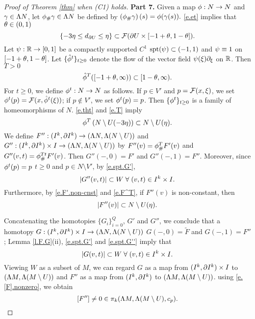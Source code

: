 \documentclass[11pt,twoside]{article}
\begin{document}
\begin{proof}[Proof of Theorem \ref{thm} when (C1) holds]
\noindent\textbf{Part 7.} Given a \cts map \(\phi:N \rightarrow N \) and \(\gamma \in \Lambda N\), let \(\phi_{\#}\gamma\in \Lambda N\) be defined by \(\left(\phi_{\#}\gamma\right)(s)=\phi(\gamma(s)). \) \eqref{e.et} implies that \tes \(\theta \in (0,1)\) \st 
\begin{equation}\label{e.tht}
\{-3\eta \leq d_{\partial U}\leq \eta\} \subset \mathcal{F}(\partial U\times [-1+\theta,1-\theta]).
\end{equation}
Let \(\psi:\mathbb{R}\rightarrow [0,1]\) be a compactly supported \(C^1\) \fn \sot \(\text{spt}(\psi)\subset (-1,1)\) and \(\psi\equiv 1\) on \([-1+\theta,1-\theta]\). Let \(\{\hat{\phi}^t\}_{t\geq 0}\) denote the flow of the vector field $\psi(\xi)\partial_{\xi}$ on $\mathbb{R}$. Then \tes \(T>0\) \st 
\begin{equation}\label{e.T}
\hat{\phi}^T([-1+\theta,\infty)) \subset [1-\theta,\infty).
\end{equation}
For \(t\geq 0\), we define \(\phi^t:N\rightarrow N\) as follows. If \(p\in V'\) and \(p=\mathcal{F}(x,\xi)\), we set \(\phi^t(p)=\mathcal{F}(x,\hat{\phi}^t(\xi))\); if \(p\notin V'\), we set \(\phi^t(p)=p\). Then \(\{\phi^t\}_{t\geq 0}\) is a \cts family of homeomorphisms of \(N\). \eqref{e.tht} and \eqref{e.T} imply
\begin{equation}\label{e.F^T}
\phi^T\left( N\setminus U(-3\eta) \right) \subset N\setminus U(\eta).
\end{equation}
We define $F'': (I^k,\partial I^k) \rightarrow (\Lambda N, \Lambda (N\setminus U))$ and \(G'':(I^k,\partial I^k)\times I\rightarrow (\Lambda N, \Lambda (N\setminus U))\) by \(F''(v)=\phi ^{T}_{\#}F'(v)\) and \(G''(v,t)=\phi ^{Tt}_{\#}F'(v)\). Then \(G''(-,0)=F'\) and \(G''(-,1)=F''\). Moreover, since \(\phi^t(p)=p\) \fa \(t\geq 0\) and \(p\in N\setminus V'\), by \eqref{e.spt.G'}, 
\begin{equation}\label{e.spt.G''}
\left|G''(v,t)\right|\subset W\;\forall\;(v,t)\in I^k\times I.
\end{equation}  
Furthermore, by \eqref{e.F'.non-cnst} and \eqref{e.F^T}, if \(F''(v)\) is non-constant, then 
\begin{equation}\label{e.F''.non-cnst}
\left|F''(v)\right|\subset N\setminus U(\eta).
\end{equation}

Concatenating the homotopies $\{G_i\}_{i=0}^Q$, $G'$ and $G''$, we conclude that \tes a homotopy \(G: (I^k,\partial I^k)\times I\rightarrow (\Lambda N, \Lambda (N\setminus U))\) \st \(G(-,0)=\tilde{F}\) and \(G(-,1)=F''\); Lemma \ref{l.F.G}(ii), \eqref{e.spt.G'} and \eqref{e.spt.G''} imply that 
\begin{equation}\label{e.spt.G}
\left|G(v,t)\right|\subset W\;\forall\;(v,t)\in I^k\times I.
\end{equation}  
Viewing \(W\) as a subset of \(M\), we can regard \(G\) as a map from $(I^k,\partial I^k)\times I$ to $(\Lambda M, \Lambda (M\setminus U))$ and \(F''\) as a map from $(I^k,\partial I^k)$ to $(\Lambda M, \Lambda (M\setminus U))$. \tf using \eqref{e.[F].nonzero}, we obtain
\begin{equation}\label{e.[F''].nonzero}
[F'']\neq 0 \in \pi_k(\Lambda M,\Lambda (M\setminus U),c_p).
\end{equation}


\end{proof}
\end{document}
